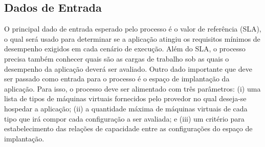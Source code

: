 \documentclass[12pt]{article}
\begin{document}
%
%


\subsection{Dados de Entrada}

O principal dado de entrada esperado pelo processo é o valor de referência (SLA), o qual será usado para determinar 
se a aplicação atingiu os requisitos mínimos de desempenho exigidos em cada cenário de execução. Além do SLA, o processo precisa também conhecer quais são as cargas de trabalho sob as quais o desempenho da aplicação deverá ser avaliado. Outro dado importante que deve ser passado como entrada para o processo é o espaço de implantação da aplicação. Para isso, o processo deve ser alimentado com três parâmetros: (i) uma lista de tipos de máquinas virtuais fornecidos pelo provedor no qual deseja-se hospedar a aplicação; (ii) a quantidade máxima de máquinas virtuais de cada tipo que irá compor cada configuração a ser avaliada; e (iii) um critério para estabelecimento das relações de capacidade entre as configurações do espaço de implantação. 
\end{document}
